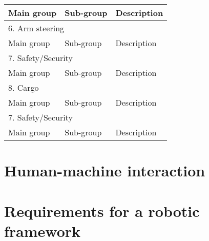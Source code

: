 \documentclass[%
oneside,    %
project,    %
nosummary   %
]{USN-MSc}
\begin{document}
\begin{table}[!ht]
\begin{tabular}{| m{1.5cm} | m{3cm} | m{10cm} |}
    Main group & Sub-group & Description  \\ \hline
    \multicolumn{3}{|l|}{6. Arm steering}    \\ \hline
    Main group & Sub-group& Description  \\ \hline
    \multicolumn{3}{|l|}{7. Safety/Security} \\ \hline
    Main group & Sub-group& Description  \\ \hline
    \multicolumn{3}{|l|}{8. Cargo}           \\ \hline
    Main group & Sub-group& Description  \\ \hline
    \multicolumn{3}{|l|}{7. Safety/Security} \\ \hline
    Main group & Sub-group& Description  \\ \hline
  \end{tabular}
  \label{tab:breakdown}
\end{table}


\section{Human-machine interaction}

\section{Requirements for a robotic framework}



~\nocite{*}

\cleardoublepage

\printbibliography[heading=bibintoc, title={References}]


\end{document}
